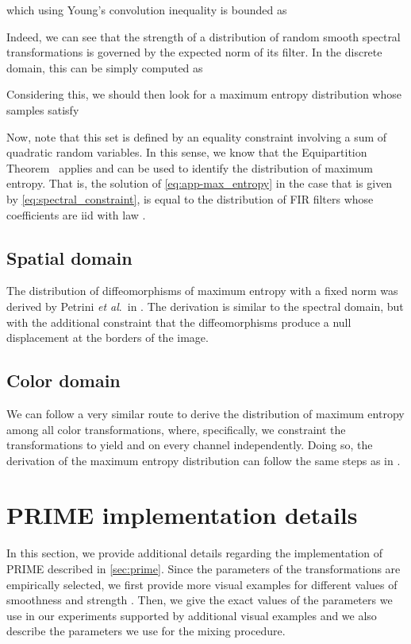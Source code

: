 \documentclass[runningheads]{llncs}
\def\etal{\emph{et al}.~}
\begin{document}
which using Young's convolution inequality is bounded as

Indeed, we can see that the strength of a distribution of random smooth spectral transformations is governed by the expected norm of its filter. In the discrete domain, this can be simply computed as


Considering this, we should then look for a maximum entropy distribution whose samples satisfy


Now, note that this set is defined by an equality constraint involving a sum of  quadratic random variables. In this sense, we know that the Equipartition Theorem~\cite{beale} applies and can be used to identify the distribution of maximum entropy. That is, the solution of \cref{eq:app-max_entropy} in the case that  is given by \cref{eq:spectral_constraint}, is equal to the distribution of FIR filters whose coefficients are iid with law .

\subsection{Spatial domain}
The distribution of diffeomorphisms of maximum entropy with a fixed norm was derived by Petrini \etal in \cite{diffeo}. The derivation is similar to the spectral domain, but with the additional constraint that the diffeomorphisms produce a null displacement at the borders of the image.

\subsection{Color domain}
We can follow a very similar route to derive the distribution of maximum entropy among all color transformations, where, specifically, we constraint the transformations to yield  and  on every channel independently. Doing so, the derivation of the maximum entropy distribution can follow the same steps as in \cite{diffeo}.

\section{PRIME implementation details}
\label{app:implementation_details}
In this section, we provide additional details regarding the implementation of PRIME described in \cref{sec:prime}. Since the parameters of the transformations are empirically selected, we first provide more visual examples for different values of smoothness  and strength . Then, we give the exact values of the parameters we use in our experiments supported by additional visual examples and we also describe the parameters we use for the mixing procedure.
\end{document}

